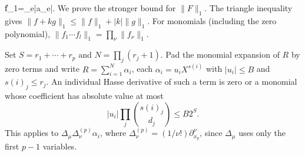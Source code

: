 \|f\|_1=\sum_e|a_e|.
\]
We prove the stronger bound for $\|F\|_1$. The triangle inequality gives
$\|f+kg\|_1\leq\|f\|_1+|k|\|g\|_1$. For monomials (including the zero
polynomial), $\|f_1\cdots f_l\|_1=\prod_\nu\|f_\nu\|_1$.

Set $S=r_1+\cdots+r_p$ and $N=\prod_j(r_j+1)$. Pad the monomial expansion
of $R$ by zero terms and write $R=\sum_{i=1}^N\alpha_i$, each
$\alpha_i=u_iX^{s(i)}$ with $|u_i|\leq B$ and $s(i)_j\leq r_j$.
An individual Hasse derivative of such a term is zero or a monomial whose
coefficient has absolute value at most
\[
|u_i|\prod_j{s(i)_j\choose d_j}\leq B2^S.
\]
This applies to $\Delta_\mu\Delta^{(p)}_\nu\alpha_i$, where
$\Delta^{(p)}_\nu=(1/\nu!)\partial_{x_p}^{\nu}$, since $\Delta_\mu$ uses
only the first $p-1$ variables.

